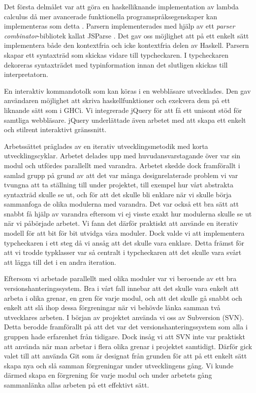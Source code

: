 Det första delmålet var att göra en haskelliknande implementation av lambda calculus då mer avancerade funktionella programspråksegenskaper kan implementeras som detta \citep{jones87}.
Parsern implementerades med hjälp av ett \emph{parser combinator}-bibliotek kallat JSParse \citep{jsparse}. Det gav oss möjlighet att på ett enkelt sätt implementera både den kontextfria och icke kontextfria delen av Haskell. Parsern skapar ett syntaxträd som skickas vidare till typcheckaren. I typcheckaren dekoreras syntaxträdet med typinformation innan det slutligen skickas till interpretatorn.

En interaktiv kommandotolk som kan köras i en webbläsare utvecklades. Den gav användaren möjlighet att skriva haskellfunktioner och exekvera dem på ett liknande sätt som i GHCi. 
Vi integrerade jQuery \citep{jquery} för att få ett unisont stöd för samtliga webbläsare. jQuery underlättade även arbetet med att skapa ett enkelt och stilrent interaktivt gränssnitt.

Arbetssättet präglades av en iterativ utvecklingsmetodik med korta utvecklingscyklar. Arbetet delades upp med huvudansvarstagande över var sin modul och utfördes parallellt med varandra. Arbetet skedde dock framförallt i samlad grupp på grund av att det var många designrelaterade problem vi var tvungna att ta ställning till under projektet, till exempel hur vårt abstrakta syntaxträd skulle se ut, och för att det skulle bli enklare när vi skulle börja sammanfoga de olika modulerna med varandra. 
Det var också ett bra sätt att snabbt få hjälp av varandra eftersom vi ej visste exakt hur modulerna skulle se ut när vi påbörjade arbetet. Vi fann det därför praktiskt att använde en iterativ modell för att bit för bit utvidga våra moduler. Dock valde vi att implementera typcheckaren i ett steg då vi ansåg att det skulle vara enklare. Detta främst för att vi trodde typklasser var så centralt i typcheckaren att det skulle vara svårt att lägga till det i en andra iteration. 

Eftersom vi arbetade parallellt med olika moduler var vi beroende av ett bra versionshanteringssystem. Bra i vårt fall innebar att det skulle vara enkelt att arbeta i olika grenar, en gren för varje modul, och att det skulle gå snabbt och enkelt att slå ihop dessa förgreningar när vi behövde länka samman två utvecklares arbeten. I början av projektet använda vi oss av Subversion (SVN). Detta berodde framförallt på att det var det versionshanteringssystem som alla i gruppen hade erfarenhet från tidigare. Dock insåg vi att SVN inte var praktiskt att använda när man arbetar i flera olika grenar i projektet samtidigt. Därför gick valet till att använda Git som är designat från grunden för att på ett enkelt sätt skapa nya och slå samman förgreningar under utvecklingens gång. Vi kunde därmed skapa en förgrening för varje modul och under arbetets gång sammanlänka allas arbeten på ett effektivt sätt. 

